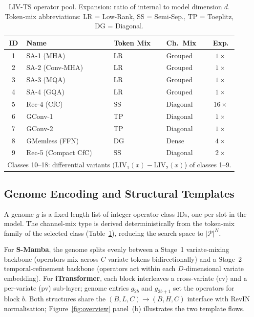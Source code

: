 \begin{table}[t]
\caption{LIV-TS operator pool. Expansion: ratio of internal to model dimension $d$. Token-mix abbreviations: LR = Low-Rank, SS = Semi-Sep., TP = Toeplitz, DG = Diagonal.}
\label{tab:operator_pool}
\centering
\footnotesize
\setlength{\tabcolsep}{4pt}
\begin{tabular}{clllc}
\toprule
ID & Name & Token Mix & Ch.\ Mix & Exp. \\
\midrule
1  & SA-1 (MHA)      & LR & Grouped  & $1\times$ \\
2  & SA-2 (Conv-MHA) & LR & Grouped  & $1\times$ \\
3  & SA-3 (MQA)      & LR & Grouped  & $1\times$ \\
4  & SA-4 (GQA)      & LR & Grouped  & $1\times$ \\
5  & Rec-4 (CfC)     & SS & Diagonal & $16\times$ \\
6  & GConv-1         & TP & Diagonal & $1\times$ \\
7  & GConv-2         & TP & Diagonal & $1\times$ \\
8  & GMemless (FFN)  & DG & Dense    & $4\times$ \\
9  & Rec-5 (Compact CfC) & SS & Diagonal & $2\times$ \\
\bottomrule
\multicolumn{5}{l}{Classes 10--18: differential variants (LIV$_1(x)-$LIV$_2(x)$) of classes 1--9.}
\end{tabular}
\end{table}

\subsection{Genome Encoding and Structural Templates}
\label{sec:genome}

A genome $g$ is a fixed-length list of integer operator class IDs, one per slot in the model.
The channel-mix type is derived deterministically from the token-mix family of the selected class (Table~\ref{tab:operator_pool}), reducing the search space to $|\mathcal{P}|^N$.

For \textbf{S-Mamba}, the genome splits evenly between a Stage~1 variate-mixing backbone (operators mix across $C$ variate tokens bidirectionally) and a Stage~2 temporal-refinement backbone (operators act within each $D$-dimensional variate embedding).
For \textbf{iTransformer}, each block interleaves a cross-variate (cv) and a per-variate (pv) sub-layer; genome entries $g_{2b}$ and $g_{2b+1}$ set the operators for block $b$.
Both structures share the $(B,L,C)\!\to\!(B,H,C)$ interface with RevIN \cite{kim2022revin} normalisation; Figure~\ref{fig:overview} panel~(b) illustrates the two template flows.

